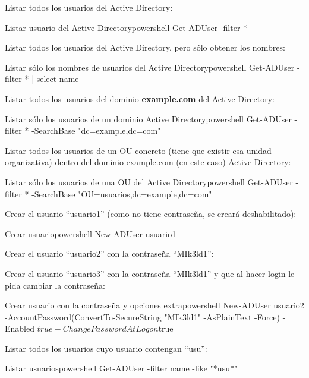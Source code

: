 Listar todos los usuarios del Active Directory:
\begin{mycode}{Listar usuario del Active Directory}{powershell}{}
Get-ADUser -filter *
\end{mycode}

Listar todos los usuarios del Active Directory, pero sólo obtener los nombres:
\begin{mycode}{Listar sólo los nombres de usuarios del Active Directory}{powershell}{}
Get-ADUser -filter * | select name
\end{mycode}


Listar todos los usuarios del dominio \textbf{example.com} del Active Directory:
\begin{mycode}{Listar sólo los  usuarios de un dominio Active Directory}{powershell}{}
Get-ADUser -filter * -SearchBase "dc=example,dc=com"
\end{mycode}


Listar todos los usuarios de un OU concreto (tiene que existir esa unidad organizativa) dentro del dominio example.com (en este caso) Active Directory:
\begin{mycode}{Listar sólo los  usuarios de una OU del Active Directory}{powershell}{}
Get-ADUser -filter * -SearchBase "OU=usuarios,dc=example,dc=com"
\end{mycode}

Crear el usuario “usuario1” (como no tiene contraseña, se creará deshabilitado):
\begin{mycode}{Crear usuario}{powershell}{}
New-ADUser usuario1
\end{mycode}

Crear el usuario “usuario2” con la contraseña “MIk3ld1”:

Crear el usuario “usuario3” con la contraseña “MIk3ld1” y que al hacer login le pida cambiar la contraseña:
\begin{mycode}{Crear usuario con la contraseña y opciones extra}{powershell}{}
New-ADUser usuario2 -AccountPassword(ConvertTo-SecureString "MIk3ld1"
-AsPlainText -Force) -Enabled $true -ChangePasswordAtLogon $true
\end{mycode}

Listar todos los usuarios cuyo usuario contengan “usu”:
\begin{mycode}{Listar usuarios}{powershell}{}
Get-ADUser -filter {name -like "*usu*"}
\end{mycode}

